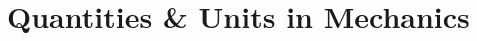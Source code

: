 \documentclass[../maths.tex]{subfiles}
\begin{document}
\chapter{Quantities \& Units in Mechanics}
\end{document}
